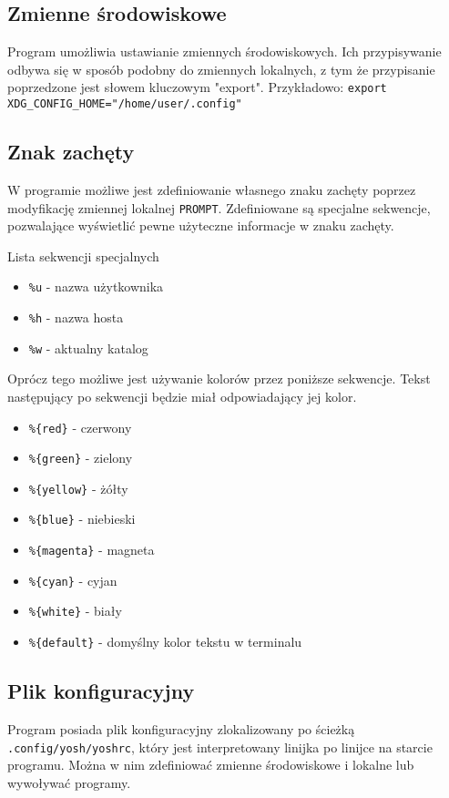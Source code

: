 \documentclass{article}
\begin{document}
\subsection*{Zmienne środowiskowe}
Program umożliwia ustawianie zmiennych środowiskowych. Ich przypisywanie odbywa się w sposób podobny do zmiennych lokalnych,
z tym że przypisanie poprzedzone jest słowem kluczowym "export". 
Przykładowo: \texttt{export XDG\_CONFIG\_HOME="/home/user/.config"}

\subsection*{Znak zachęty}
W programie możliwe jest zdefiniowanie własnego znaku zachęty poprzez modyfikację zmiennej lokalnej \texttt{PROMPT}.
Zdefiniowane są specjalne sekwencje, pozwalające wyświetlić pewne użyteczne informacje w znaku zachęty.

Lista sekwencji specjalnych
\begin{itemize}
    \item \texttt{\%u} - nazwa użytkownika
    \item \texttt{\%h} - nazwa hosta
    \item \texttt{\%w} - aktualny katalog
\end{itemize}

Oprócz tego możliwe jest używanie kolorów przez poniższe sekwencje. Tekst następujący
po sekwencji będzie miał odpowiadający jej kolor.
\begin{itemize}
    \item \texttt{\%\{red\}} - czerwony
    \item \texttt{\%\{green\}} - zielony
    \item \texttt{\%\{yellow\}} - żółty
    \item \texttt{\%\{blue\}} - niebieski
    \item \texttt{\%\{magenta\}} - magneta
    \item \texttt{\%\{cyan\}} - cyjan
    \item \texttt{\%\{white\}} - biały
    \item \texttt{\%\{default\}} - domyślny kolor tekstu w terminalu
\end{itemize}

\subsection*{Plik konfiguracyjny}
Program posiada plik konfiguracyjny zlokalizowany po ścieżką \texttt{.config/yosh/yoshrc}, który jest interpretowany
linijka po linijce na starcie programu. Można w nim zdefiniować zmienne środowiskowe i lokalne lub wywoływać programy.
\end{document}
